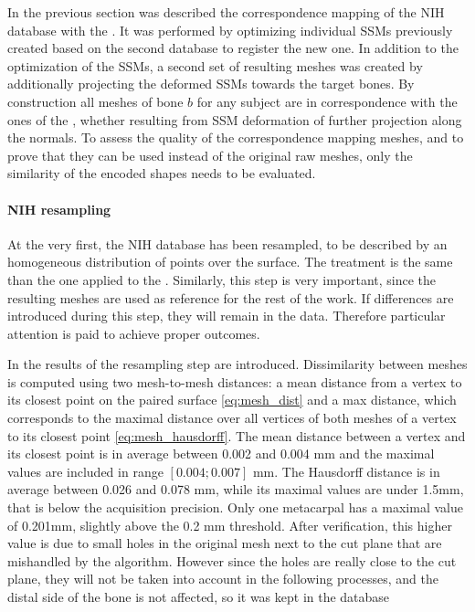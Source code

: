 In the previous section was described the correspondence mapping of the NIH database with the \db*. It was performed by optimizing individual SSMs previously created based on the second database to register the new one. In addition to the optimization of the SSMs, a second set of resulting meshes was created by additionally projecting the deformed SSMs towards the target bones. By construction all meshes of bone $b$ for any subject are in correspondence with the ones of the \db*, whether resulting from SSM deformation of further projection along the normals. To assess the quality of the correspondence mapping meshes, and to prove that they can be used instead of the original raw meshes, only the similarity of the encoded shapes needs to be evaluated. 


\paragraph{NIH resampling}

At the very first, the NIH database has been resampled, to be described by an homogeneous distribution of points over the surface. The treatment is the same than the one applied to the \db*. Similarly, this step is very important, since the resulting meshes are used as reference for the rest of the work. If differences are introduced during this step, they will remain in the data. Therefore particular attention is paid to achieve proper outcomes. 

In  the results of the resampling step are introduced. Dissimilarity between meshes is computed using two mesh-to-mesh distances: a mean distance from a vertex to its closest point on the paired surface \eqref{eq:mesh_dist} and a max distance, which corresponds to the maximal distance over all vertices of both meshes of a vertex to its closest point \eqref{eq:mesh_hausdorff}. The mean distance between a vertex and its closest point is in average between 0.002 and 0.004 mm and the maximal values are included in range $[0.004; 0.007]$ mm. The Hausdorff distance is in average between 0.026 and 0.078 mm, while its maximal values are under 1.5mm, that is below the acquisition precision. Only one \first* metacarpal has a maximal value of 0.201mm, slightly above the 0.2 mm threshold. After verification, this higher value is due to small holes in the original mesh next to the cut plane that are mishandled by the algorithm. However since the holes are really close to the cut plane, they will not be taken into account in the following processes, and the distal side of the bone is not affected, so it was kept in the database

